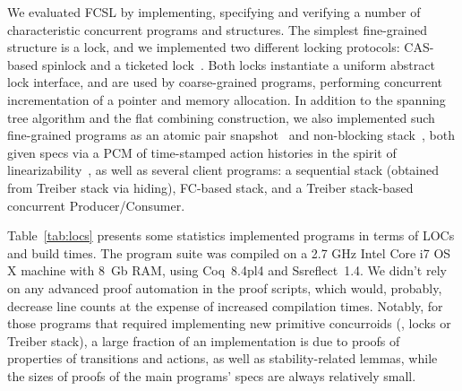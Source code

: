 %
We evaluated FCSL by implementing, specifying and verifying a number
of characteristic concurrent programs and structures. The simplest
fine-grained structure is a lock, and we implemented two different
locking protocols: CAS-based spinlock and a ticketed
lock~\cite{DinsdaleYoung-al:ECOOP10}. Both locks instantiate a uniform
abstract lock interface, and are used by coarse-grained programs,
performing concurrent incrementation of a pointer and memory
allocation. In addition to the spanning tree algorithm and the flat
combining construction, we also implemented such fine-grained programs
as an atomic pair snapshot~\cite{Qadeer-al:TR09,Liang-Feng:PLDI13} and
non-blocking stack~\cite{Treiber:TR}, both given specs via a PCM of
time-stamped action histories in the spirit of
linearizability~\cite{Herlihy-Wing:TOPLAS90}, as well as several
client programs: a sequential stack (obtained from Treiber stack via
hiding), FC-based stack, and a Treiber stack-based concurrent
Producer/Consumer.


Table~\ref{tab:locs} presents some statistics \wrt implemented
programs in terms of LOCs and build times.  The program suite was
compiled on a 2.7 GHz Intel Core i7 OS X machine with 8~Gb RAM, using
Coq~8.4pl4 and Ssreflect~1.4.
%
We didn't rely on any advanced proof automation in the proof scripts,
which would, probably, decrease line counts at the expense of
increased compilation times. Notably, for those programs that required
implementing new primitive concurroids (\eg, locks or Treiber stack),
a large fraction of an implementation is due to proofs of properties
of transitions and actions, as well as stability-related lemmas, while
the sizes of proofs of the main programs' specs are always relatively
small.


